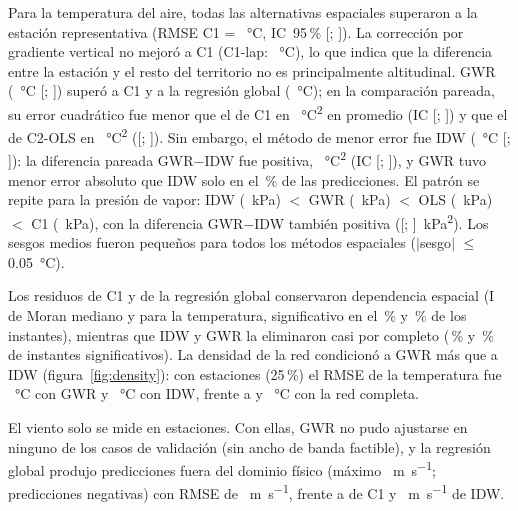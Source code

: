 Para la temperatura del aire, todas las alternativas espaciales superaron a
la estación representativa (RMSE C1 = \CVTaCOneRmse{}~\si{\celsius},
IC~95\,\% [\CVTaCOneRmseLo; \CVTaCOneRmseHi]). La corrección por gradiente
vertical no mejoró a C1 (C1-lap: \CVTaCOneLapRmse{}~\si{\celsius}), lo que
indica que la diferencia entre la estación y el resto del territorio no es
principalmente altitudinal. GWR (\CVTaCThreeGWRRmse{}~\si{\celsius}
[\CVTaCThreeGWRRmseLo; \CVTaCThreeGWRRmseHi]) superó a C1 y a la regresión
global (\CVTaCTwoOLSRmse{}~\si{\celsius}); en la comparación pareada, su error
cuadrático fue menor que el de C1 en \PairTaCOneDse{}~\si{\celsius\squared}
en promedio (IC [\PairTaCOneLo; \PairTaCOneHi]) y que el de C2-OLS en
\PairTaCTwoOLSDse{}~\si{\celsius\squared} ([\PairTaCTwoOLSLo; \PairTaCTwoOLSHi]).
Sin embargo, el método de menor error fue IDW (\CVTaCTwoIDWRmse{}~\si{\celsius}
[\CVTaCTwoIDWRmseLo; \CVTaCTwoIDWRmseHi]): la diferencia pareada GWR$-$IDW fue
positiva, \PairTaCTwoIDWDse{}~\si{\celsius\squared} (IC
[\PairTaCTwoIDWLo; \PairTaCTwoIDWHi]), y GWR tuvo menor error absoluto que IDW
solo en el \PairTaCTwoIDWShare\,\% de las predicciones. El patrón se repite
para la presión de vapor: IDW (\CVEaCTwoIDWRmse{}~kPa) $<$ GWR
(\CVEaCThreeGWRRmse{}~kPa) $<$ OLS (\CVEaCTwoOLSRmse{}~kPa) $<$ C1
(\CVEaCOneRmse{}~kPa), con la diferencia GWR$-$IDW también positiva
([\PairEaCTwoIDWLo; \PairEaCTwoIDWHi]~\si{\kilo\pascal\squared}). Los sesgos
medios fueron pequeños para todos los métodos espaciales ($|$sesgo$|$ $\le$
\num{0.05}~\si{\celsius}).

Los residuos de C1 y de la regresión global conservaron dependencia
espacial (I de Moran mediano \MoranTaCOneI{} y \MoranTaCTwoOLSI{} para la
temperatura, significativo en el \MoranTaCOneSig\,\% y \MoranTaCTwoOLSSig\,\%
de los instantes), mientras que IDW y GWR la eliminaron casi por completo
(\MoranTaCTwoIDWSig\,\% y \MoranTaCThreeGWRSig\,\% de instantes
significativos). La densidad de la red condicionó a GWR más que a IDW
(figura~\ref{fig:density}): con \DensTaCThreeGWRQuarterN{} estaciones (25\,\%)
el RMSE de la temperatura fue \DensTaCThreeGWRQuarter{}~\si{\celsius} con GWR y
\DensTaCTwoIDWQuarter{}~\si{\celsius} con IDW, frente a \DensTaCThreeGWRAll{} y
\DensTaCTwoIDWAll{}~\si{\celsius} con la red completa.

El viento solo se mide en \NStationsWind{} estaciones. Con ellas, GWR no pudo
ajustarse en ninguno de los \CVWindCThreeGWRTotal{} casos de validación
(sin ancho de banda factible), y la regresión global produjo predicciones
fuera del dominio físico (máximo \CVWindOLSMax{}~\si{\metre\per\second};
\CVWindOLSNeg{} predicciones negativas) con RMSE de
\CVWindCTwoOLSRmse{}~\si{\metre\per\second}, frente a \CVWindCOneRmse{} de C1
y \CVWindCTwoIDWRmse{}~\si{\metre\per\second} de IDW.

